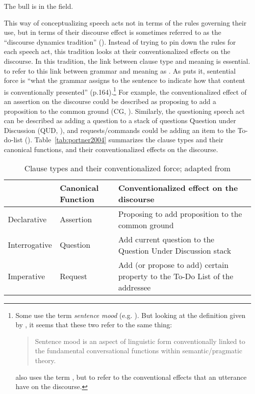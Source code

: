 The bull is in the field.
\eex

This way of conceptualizing speech acts not in terms of the rules governing their use, but in terms of their discourse effect is sometimes referred to as the “discourse dynamics tradition” (\cite{murraystarr2020}). Instead of trying to pin down the rules for each speech act, this tradition looks at their conventionalized effects on the discourse. 
In this tradition, the link between clause type and meaning is essential. \textcite{chierchia1990textbook} to refer to this link between grammar and meaning as . As \textcite{chierchia1990textbook} puts it, sentential force is ``what the grammar assigns to the sentence to indicate how that content is conventionally presented'' (p.164).\footnote{Some use the term \emph{sentence mood} (e.g. \cite{portner2018}). But looking at the definition given by \textcite{portner2018}, it seems that these two refer to the same thing:
\begin{quote}
Sentence mood is an aspect of linguistic form conventionally linked to the fundamental conversational functions within semantic/pragmatic theory.\\
\hspace*{\fill} \hfill \textcite[p.122]{portner2018}
\end{quote}
\cite{portner2018} also uses the term , but to refer to the conventional effects that an utterance have on the discourse.  
} 
For example, the conventionalized effect of an assertion on the discourse could be described as proposing to add a proposition to the common ground (CG, \cite{stalnaker1978assertion,stalnaker2002cg}). Similarly, the questioning speech act can be described as adding a question to a stack of questions Question under Discussion (QUD, \cite{roberts1996, ginzburg1995-1}), and requests/commands could be adding an item to the To-do-list (\cite{portner2004}). Table~\ref{tab:portner2004} summarizes the clause types and their canonical functions, and their conventionalized effects on the discourse.

\begin{table}[H]
\begin{center}
\begin{tabular}{l|l|p{8cm}} 
\hline 
& Canonical Function & Conventionalized effect on the discourse \\
\hline
Declarative & Assertion & Proposing to add proposition to the common ground \\ 
\hline
Interrogative & Question & Add current question to the Question Under Discussion stack \\
\hline
Imperative & Request & Add (or propose to add) certain property to the To-Do List of the addressee \\ 
\hline
\end{tabular} 
\end{center}
\caption{Clause types and their conventionalized force; adapted from \textcite[p.238]{portner2004}}
\label{tab:intro:portner2004}
\end{table}



